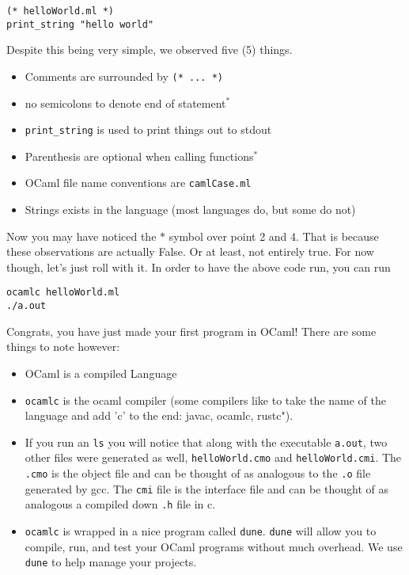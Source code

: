 \documentclass[main.tex]{subfiles}
\begin{document}
\begin{lstlisting}[style=MyOcamlStyle]
(* helloWorld.ml *)
print_string "hello world"
\end{lstlisting}
Despite this being very simple, we observed five (5) things.
\begin{itemize}
    \item Comments are surrounded by \texttt{(* ... *)}
    \item no semicolons to denote end of statement$^*$
    \item \texttt{print\_string} is used to print things out to stdout
    \item Parenthesis are optional when calling functions$^*$ 
    \item OCaml file name conventions are \texttt{camlCase.ml}
    \item Strings exists in the language (most languages do, but some do not)
\end{itemize}
Now you may have noticed the $*$ symbol over point 2 and 4. That is because these observations are actually False. Or at least, not entirely true. For now though, let's just roll with it. 
In order to have the above code run, you can run
\begin{lstlisting}[]
ocamlc helloWorld.ml
./a.out
\end{lstlisting}
Congrats, you have just made your first program in OCaml!
There are some things to note however: 
\begin{itemize}
    \item OCaml is a compiled Language
    \item \texttt{ocamlc} is the ocaml compiler (some compilers like to take the name of the language and add 'c' to the end: javac, ocamlc, rustc"). 
    \item If you run an \texttt{ls} you will notice that along with the executable \texttt{a.out}, two other files were generated as well, \texttt{helloWorld.cmo} and \texttt{helloWorld.cmi}. The \texttt{.cmo} is the object file and can be thought of as analogous to the \texttt{.o} file generated by gcc. The \texttt{cmi} file is the interface file and can be thought of as analogous a compiled down \texttt{.h} file in c. 
    \item \texttt{ocamlc} is wrapped in a nice program called \texttt{dune}. \texttt{dune} will allow you to compile, run, and test your OCaml programs without much overhead. We use \texttt{dune} to help manage your projects. 
\end{itemize}
\end{document}
